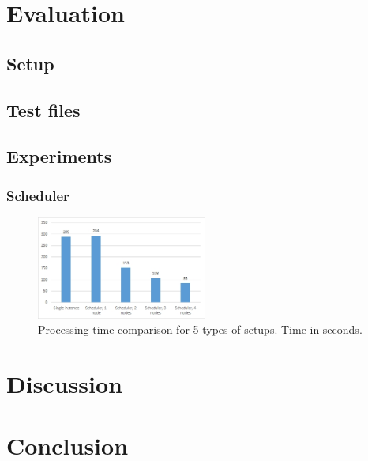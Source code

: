 \documentclass{acm_proc_article-sp}
\begin{document}
\section{Evaluation}
\label{sec:eval}

\subsection{Setup}

\subsection{Test files}

\subsection{Experiments}

\subsubsection{Scheduler}
\begin{figure}[]
	\centering
	\includegraphics[width=0.5\textwidth]{images/diagram_total_processing.jpg}
	\caption{Processing time comparison for 5 types of setups. Time in seconds.}
	\label{fig:diagram_total_processing}
\end{figure}


\section{Discussion}
\label{sec:discussion}

\section{Conclusion}
\label{sec:conclusion}
\end{document}
